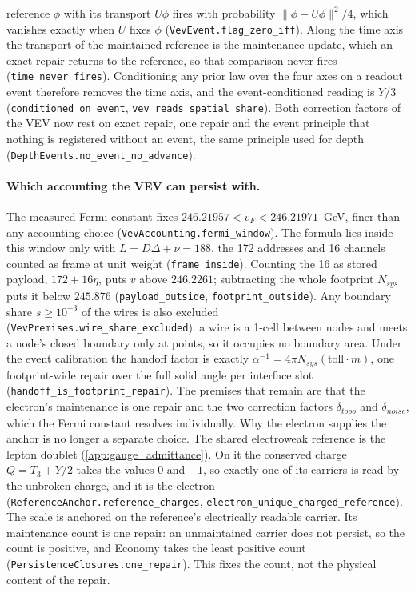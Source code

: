 reference $\phi$ with its transport $U\phi$ fires with probability $\|\phi-U\phi\|^2/4$, which vanishes exactly when $U$ fixes $\phi$ (\texttt{VevEvent.flag\_zero\_iff}). Along the time axis the transport of the maintained reference is the maintenance update, which an exact repair returns to the reference, so that comparison never fires (\texttt{time\_never\_fires}). Conditioning any prior law over the four axes on a readout event therefore removes the time axis, and the event-conditioned reading is $Y/3$ (\texttt{conditioned\_on\_event}, \texttt{vev\_reads\_spatial\_share}). Both correction factors of the VEV now rest on exact repair, one repair and the event principle that nothing is registered without an event, the same principle used for depth (\texttt{DepthEvents.no\_event\_no\_advance}).

\paragraph{Which accounting the VEV can persist with.} The measured Fermi constant fixes $246.21957<v_F<246.21971$~GeV, finer than any accounting choice (\texttt{VevAccounting.fermi\_window}). The formula lies inside this window only with $L=D\Delta+\nu=188$, the 172 addresses and 16 channels counted as frame at unit weight (\texttt{frame\_inside}). Counting the 16 as stored payload, $172+16\eta$, puts $v$ above $246.2261$; subtracting the whole footprint $N_{sys}$ puts it below $245.876$ (\texttt{payload\_outside}, \texttt{footprint\_outside}). Any boundary share $s\ge10^{-3}$ of the wires is also excluded (\texttt{VevPremises.wire\_share\_excluded}): a wire is a 1-cell between nodes and meets a node's closed boundary only at points, so it occupies no boundary area. Under the event calibration the handoff factor is exactly $\alpha^{-1}=4\pi N_{sys}(\mathrm{toll}\cdot m)$, one footprint-wide repair over the full solid angle per interface slot (\texttt{handoff\_is\_footprint\_repair}). The premises that remain are that the electron's maintenance is one repair and the two correction factors $\delta_{topo}$ and $\delta_{noise}$, which the Fermi constant resolves individually. Why the electron supplies the anchor is no longer a separate choice. The shared electroweak reference is the lepton doublet (\cref{app:gauge_admittance}). On it the conserved charge $Q=T_3+Y/2$ takes the values $0$ and $-1$, so exactly one of its carriers is read by the unbroken charge, and it is the electron (\texttt{ReferenceAnchor.reference\_charges}, \texttt{electron\_unique\_charged\_reference}). The scale is anchored on the reference's electrically readable carrier. Its maintenance count is one repair: an unmaintained carrier does not persist, so the count is positive, and Economy takes the least positive count (\texttt{PersistenceClosures.one\_repair}). This fixes the count, not the physical content of the repair.

